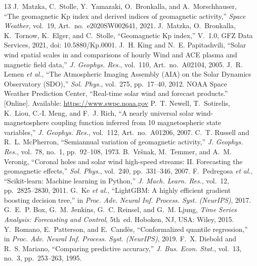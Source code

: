 \documentclass[conference,a4paper]{IEEEtran}
\begin{document}
\balance
\begin{thebibliography}{13}
 J.~Matzka, C.~Stolle, Y.~Yamazaki, O.~Bronkalla, and A.~Morschhauser, ``The geomagnetic Kp index and derived indices of geomagnetic activity,'' \emph{Space Weather}, vol.~19, Art.~no.~e2020SW002641, 2021.
 J.~Matzka, O.~Bronkalla, K.~Tornow, K.~Elger, and C.~Stolle, ``Geomagnetic Kp index,'' V.~1.0, GFZ Data Services, 2021, doi: 10.5880/Kp.0001.
 J.~H. King and N.~E. Papitashvili, ``Solar wind spatial scales in and comparisons of hourly Wind and ACE plasma and magnetic field data,'' \emph{J. Geophys. Res.}, vol.~110, Art.~no.~A02104, 2005.
 J.~R. Lemen \emph{et al.}, ``The Atmospheric Imaging Assembly (AIA) on the Solar Dynamics Observatory (SDO),'' \emph{Sol. Phys.}, vol.~275, pp.~17--40, 2012.
 NOAA Space Weather Prediction Center, ``Real-time solar wind and forecast products.'' [Online]. Available: \url{https://www.swpc.noaa.gov}
 P.~T. Newell, T.~Sotirelis, K.~Liou, C.-I. Meng, and F.~J. Rich, ``A nearly universal solar wind-magnetosphere coupling function inferred from 10 magnetospheric state variables,'' \emph{J. Geophys. Res.}, vol.~112, Art.~no.~A01206, 2007.
 C.~T. Russell and R.~L. McPherron, ``Semiannual variation of geomagnetic activity,'' \emph{J. Geophys. Res.}, vol.~78, no.~1, pp.~92--108, 1973.
 B.~Vr\v{s}nak, M.~Temmer, and A.~M. Veronig, ``Coronal holes and solar wind high-speed streams: II. Forecasting the geomagnetic effects,'' \emph{Sol. Phys.}, vol.~240, pp.~331--346, 2007.
 F.~Pedregosa \emph{et al.}, ``Scikit-learn: Machine learning in Python,'' \emph{J. Mach. Learn. Res.}, vol.~12, pp.~2825--2830, 2011.
 G.~Ke \emph{et al.}, ``LightGBM: A highly efficient gradient boosting decision tree,'' in \emph{Proc. Adv. Neural Inf. Process. Syst. (NeurIPS)}, 2017.
 G.~E.~P. Box, G.~M. Jenkins, G.~C. Reinsel, and G.~M. Ljung, \emph{Time Series Analysis: Forecasting and Control}, 5th~ed. Hoboken, NJ, USA: Wiley, 2015.
 Y.~Romano, E.~Patterson, and E.~Cand\`es, ``Conformalized quantile regression,'' in \emph{Proc. Adv. Neural Inf. Process. Syst. (NeurIPS)}, 2019.
 F.~X. Diebold and R.~S. Mariano, ``Comparing predictive accuracy,'' \emph{J. Bus. Econ. Stat.}, vol.~13, no.~3, pp.~253--263, 1995.
\end{thebibliography}
\end{document}
